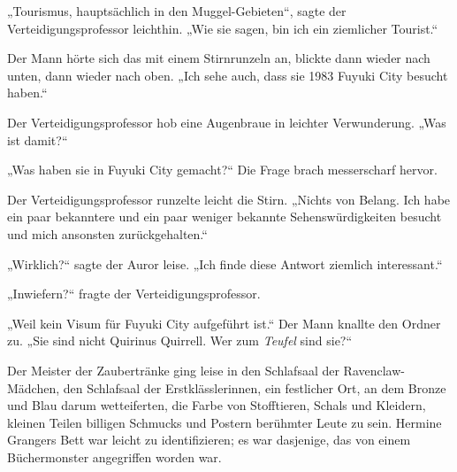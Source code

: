 „Tourismus, hauptsächlich in den Muggel-Gebieten“, sagte der Verteidigungsprofessor leichthin.
„Wie sie sagen, bin ich ein ziemlicher Tourist.“

Der Mann hörte sich das mit einem Stirnrunzeln an, blickte dann wieder nach unten, dann wieder nach oben.
„Ich sehe auch, dass sie 1983 Fuyuki City besucht haben.“

Der Verteidigungsprofessor hob eine Augenbraue in leichter Verwunderung.
„Was ist damit?“

„Was haben sie in Fuyuki City gemacht?“ Die Frage brach messerscharf hervor.

Der Verteidigungsprofessor runzelte leicht die Stirn.
„Nichts von Belang. Ich habe ein paar bekanntere und ein paar weniger bekannte Sehenswürdigkeiten besucht und mich ansonsten zurückgehalten.“

„Wirklich?“ sagte der Auror leise.
„Ich finde diese Antwort ziemlich interessant.“

„Inwiefern?“ fragte der Verteidigungsprofessor.

„Weil kein Visum für Fuyuki City aufgeführt ist.“ Der Mann knallte den Ordner zu.
„Sie sind nicht Quirinus Quirrell. Wer zum \emph{Teufel} sind sie?“

\later

Der Meister der Zaubertränke ging leise in den Schlafsaal der Ravenclaw-Mädchen, den Schlafsaal der Erstklässlerinnen, ein festlicher Ort, an dem Bronze und Blau darum wetteiferten, die Farbe von Stofftieren, Schals und Kleidern, kleinen Teilen billigen Schmucks und Postern berühmter Leute zu sein. Hermine Grangers Bett war leicht zu identifizieren; es war dasjenige, das von einem Büchermonster angegriffen worden war.

